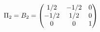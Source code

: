 \documentclass[preview]{standalone}
\begin{document}
\begin{align*}
\special{dvisvgm:raw <g id='unique000'>}\Pi_2=B_2=\begin{pmatrix}1/2&-1/2&0\\-1/2&1/2&0\\0&0&1\end{pmatrix}\special{dvisvgm:raw </g>}
\end{align*}
\end{document}
